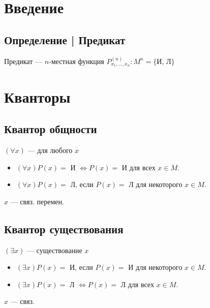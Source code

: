 \documentclass{article}
\begin{document}
\section{Введение}

\subsection{Определение | Предикат}
Предикат --- $n$-местная функция $P^{(n)}_{x_1, \dots, x_n}: M^n = \{$И, Л$\}$

\section{Кванторы}

\subsection{Квантор общности}
$(\forall x)$ --- для любого $x$
\begin{itemize}
    \item $(\forall x) P(x) =$ И $\Leftrightarrow P(x) =$ И для всех $x \in M$.
    \item $(\forall x) P(x) =$ Л, если $P(x) =$ Л для некоторого $x \in M$.
\end{itemize}
$x$ --- связ. перемен.


\subsection{Квантор существования}
$(\exists x)$ --- существование $x$
\begin{itemize}
    \item $(\exists x) P(x) =$ И, если $P(x) =$ И для некоторого $x \in M$.
    \item $(\exists x) P(x) =$ Л $\Leftrightarrow P(x) =$ Л для всех $x \in M$.
\end{itemize}
$x$ --- связ.
\end{document}
